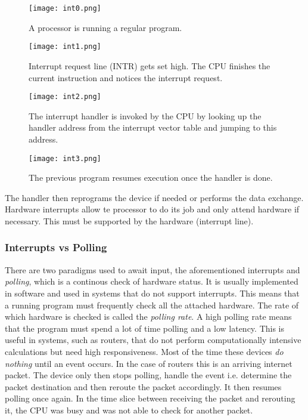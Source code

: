 \begin{figure}[H]
\begin{center}
\texttt{[image: int0.png]}
\caption{A processor is running a regular program.}
\end{center}
\end{figure}

\begin{figure}[H]
\begin{center}
\texttt{[image: int1.png]}
\caption{Interrupt request line (INTR) gets set high. The CPU finishes the current instruction and notices the interrupt request.}
\end{center}
\end{figure}

\begin{figure}[H]
\begin{center}
\texttt{[image: int2.png]}
\caption{The interrupt handler is invoked by the CPU by looking up the handler address from the
interrupt vector table and jumping to this address.}
\end{center}
\end{figure}

\begin{figure}[H]
\begin{center}
\texttt{[image: int3.png]}
\caption{The previous program resumes execution once the handler is done. }
\end{center}
\end{figure}


The handler then reprograms the device if needed or performs the data exchange. Hardware 
interrupts allow te processor to do its job and only attend hardware if necessary. This
must be supported by the hardware (interrupt line).

\subsubsection{Interrupts vs Polling}

There are two paradigms used to await input, the aforementioned interrupts and \textit{polling}, 
which is a continous check of hardware status. It is usually implemented in software and 
used in systems that do not support interrupts. This means that a running program must 
frequently check all the attached hardware. The rate of which hardware is checked is called 
the \textit{polling rate}. A high polling rate means that the program must spend a lot of time 
polling and a low latency. This is useful in systems, such as routers, that do not perform 
computationally intensive calculations but need high responsiveness. Most of the time these 
devices \textit{do nothing} until an event occurs. In the case of routers this is an arriving 
internet packet. The device only then stops polling, handle the event i.e. determine 
the packet destination and then reroute the packet accordingly. It then resumes polling once 
again. In the time slice between receiving the packet and rerouting it, the CPU was busy and
was not able to check for another packet. 

